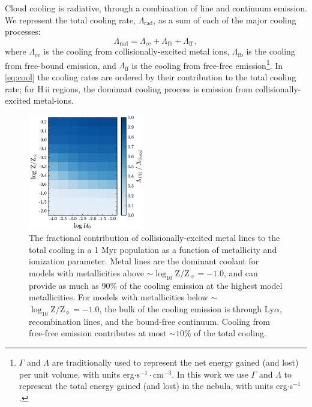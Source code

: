 \documentclass[linenumbers, trackchanges, tighten]{aastex61}%
\newcommand{\Eq}[1]{\autoref{eq:#1}}
\newcommand{\logten}{\ensuremath{\log_{10}}}
\newcommand{\hii}{H\,{\sc ii}\xspace}
\newcommand{\logZeq}[1]{\ensuremath{\logten \mathrm{Z}/\mathrm{Z}_{\sun} = #1}}
\newcommand{\Cool}{\ensuremath{\Lambda_{\mathrm{rad}}}}
\begin{document}
Cloud cooling is radiative, through a combination of line and continuum emission. We represent the total cooling rate, \Cool{}, as a sum of each of the major cooling processes:
\begin{equation}\label{eq:cool}
    \Lambda_{\mathrm{rad}} = \Lambda_{\mathrm{ce}} + \Lambda_{\mathrm{fb}} + \Lambda_{\mathrm{ff}} \, ,
\end{equation}
where $\Lambda_{\mathrm{ce}}$ is the cooling from collisionally-excited metal ions, $\Lambda_{\mathrm{fb}}$ is the cooling from free-bound emission, and $\Lambda_{\mathrm{ff}}$ is the cooling from free-free emission\footnote{$\Gamma$ and $\Lambda$ are traditionally used to represent the net energy gained (and lost) per unit volume, with units erg$\cdot$s$^{-1}\cdot$cm$^{-3}$. In this work we use $\Gamma$ and $\Lambda$ to represent the total energy gained (and lost) in the nebula, with units erg$\cdot$s$^{-1}$.}. In \Eq{cool} the cooling rates are ordered by their contribution to the total cooling rate; for \hii regions, the dominant cooling process is emission from collisionally-excited metal-ions.

\begin{figure}[!htbp]
  \begin{centering}
    \includegraphics[width=0.45\textwidth]{f5.pdf}
    \caption{The fractional contribution of collisionally-excited metal lines to the total cooling in a 1 Myr population as a function of metallicity and ionization parameter. Metal lines are the dominant coolant for models with metallicities above $\sim$\logZeq{-1.0}, and can provide as much as 90\% of the cooling emission at the highest model metallicities. For models with metallicities below $\sim$\logZeq{-1.0}, the bulk of the cooling emission is through Ly$\alpha$, recombination lines, and the bound-free continuum. Cooling from free-free emission contributes at most ${\sim}10\%$ of the total cooling. }
    \label{fig:cooling}
  \end{centering}
\end{figure}
\end{document}
